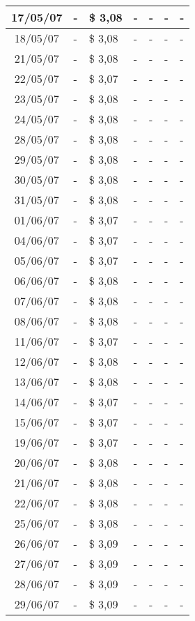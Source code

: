 \begin{center}
\begin{longtable}{|c|p{1.5cm}|p{1.5cm}|p{1.5cm}|p{1.5cm}|p{1.5cm}|p{1.5cm}|}
17/05/07 & - & \$ 3,08 & - & - & - & - \\ \hline
18/05/07 & - & \$ 3,08 & - & - & - & - \\ \hline
21/05/07 & - & \$ 3,08 & - & - & - & - \\ \hline
22/05/07 & - & \$ 3,07 & - & - & - & - \\ \hline
23/05/07 & - & \$ 3,08 & - & - & - & - \\ \hline
24/05/07 & - & \$ 3,08 & - & - & - & - \\ \hline
28/05/07 & - & \$ 3,08 & - & - & - & - \\ \hline
29/05/07 & - & \$ 3,08 & - & - & - & - \\ \hline
30/05/07 & - & \$ 3,08 & - & - & - & - \\ \hline
31/05/07 & - & \$ 3,08 & - & - & - & - \\ \hline
01/06/07 & - & \$ 3,07 & - & - & - & - \\ \hline
04/06/07 & - & \$ 3,07 & - & - & - & - \\ \hline
05/06/07 & - & \$ 3,07 & - & - & - & - \\ \hline
06/06/07 & - & \$ 3,08 & - & - & - & - \\ \hline
07/06/07 & - & \$ 3,08 & - & - & - & - \\ \hline
08/06/07 & - & \$ 3,08 & - & - & - & - \\ \hline
11/06/07 & - & \$ 3,07 & - & - & - & - \\ \hline
12/06/07 & - & \$ 3,08 & - & - & - & - \\ \hline
13/06/07 & - & \$ 3,08 & - & - & - & - \\ \hline
14/06/07 & - & \$ 3,07 & - & - & - & - \\ \hline
15/06/07 & - & \$ 3,07 & - & - & - & - \\ \hline
19/06/07 & - & \$ 3,07 & - & - & - & - \\ \hline
20/06/07 & - & \$ 3,08 & - & - & - & - \\ \hline
21/06/07 & - & \$ 3,08 & - & - & - & - \\ \hline
22/06/07 & - & \$ 3,08 & - & - & - & - \\ \hline
25/06/07 & - & \$ 3,08 & - & - & - & - \\ \hline
26/06/07 & - & \$ 3,09 & - & - & - & - \\ \hline
27/06/07 & - & \$ 3,09 & - & - & - & - \\ \hline
28/06/07 & - & \$ 3,09 & - & - & - & - \\ \hline
29/06/07 & - & \$ 3,09 & - & - & - & - \\ \hline

\end{longtable}
\end{center}
